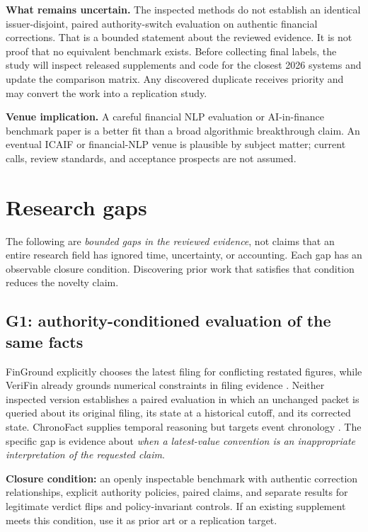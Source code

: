 \documentclass[11pt,a4paper]{article}
\newcommand{\pbreak}{\clearpage}
\newcommand{\lead}[1]{\textbf{\color{navy}#1}}
\begin{document}
\lead{What remains uncertain.} The inspected methods do not establish an identical issuer-disjoint, paired authority-switch evaluation on authentic financial corrections. That is a bounded statement about the reviewed evidence. It is not proof that no equivalent benchmark exists. Before collecting final labels, the study will inspect released supplements and code for the closest 2026 systems and update the comparison matrix. Any discovered duplicate receives priority and may convert the work into a replication study.

\lead{Venue implication.} A careful financial NLP evaluation or AI-in-finance benchmark paper is a better fit than a broad algorithmic breakthrough claim. An eventual ICAIF or financial-NLP venue is plausible by subject matter; current calls, review standards, and acceptance prospects are not assumed.

\pbreak
\section{Research gaps}
The following are \emph{bounded gaps in the reviewed evidence}, not claims that an entire research field has ignored time, uncertainty, or accounting. Each gap has an observable closure condition. Discovering prior work that satisfies that condition reduces the novelty claim.

\subsection{G1: authority-conditioned evaluation of the same facts}
FinGround explicitly chooses the latest filing for conflicting restated figures, while VeriFin already grounds numerical constraints in filing evidence \cite{finground,verifin}. Neither inspected version establishes a paired evaluation in which an unchanged packet is queried about its original filing, its state at a historical cutoff, and its corrected state. ChronoFact supplies temporal reasoning but targets event chronology \cite{chronofact}. The specific gap is evidence about \emph{when a latest-value convention is an inappropriate interpretation of the requested claim}.

\lead{Closure condition:} an openly inspectable benchmark with authentic correction relationships, explicit authority policies, paired claims, and separate results for legitimate verdict flips and policy-invariant controls. If an existing supplement meets this condition, use it as prior art or a replication target.
\end{document}
